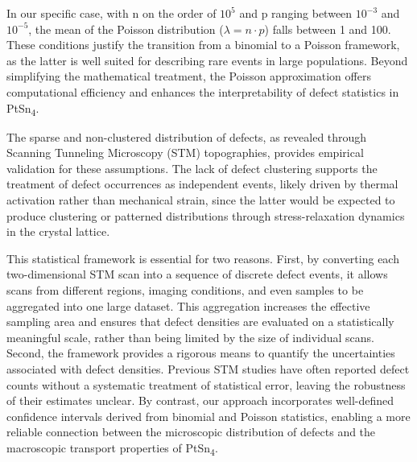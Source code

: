 \par In our specific case, with n on the order of $10^5$ and p ranging between $10^{-3}$ and $10^{-5}$, the mean of the Poisson distribution ($\lambda=n\cdot p$) falls between 1 and 100. These conditions justify the transition from a binomial to a Poisson framework, as the latter is well suited for describing rare events in large populations. Beyond simplifying the mathematical treatment, the Poisson approximation offers computational efficiency and enhances the interpretability of defect statistics in PtSn\textsubscript{4}.
\par The sparse and non-clustered distribution of defects, as revealed through Scanning Tunneling Microscopy (STM) topographies, provides empirical validation for these assumptions. The lack of defect clustering supports the treatment of defect occurrences as independent events, likely driven by thermal activation rather than mechanical strain, since the latter would be expected to produce clustering or patterned distributions through stress-relaxation dynamics in the crystal lattice.

This statistical framework is essential for two reasons. First, by converting each two-dimensional STM scan into a sequence of discrete defect events, it allows scans from different regions, imaging conditions, and even samples to be aggregated into one large dataset. This aggregation increases the effective sampling area and ensures that defect densities are evaluated on a statistically meaningful scale, rather than being limited by the size of individual scans. Second, the framework provides a rigorous means to quantify the uncertainties associated with defect densities. Previous STM studies have often reported defect counts without a systematic treatment of statistical error, leaving the robustness of their estimates unclear\cite{daiIntrinsicLimitTopological2016}\cite{alpichshevSTMImagingImpurity2012}\cite{mcelroyAtomicScaleSourcesMechanism2005}. By contrast, our approach incorporates well-defined confidence intervals derived from binomial and Poisson statistics, enabling a more reliable connection between the microscopic distribution of defects and the macroscopic transport properties of PtSn\textsubscript{4}.

